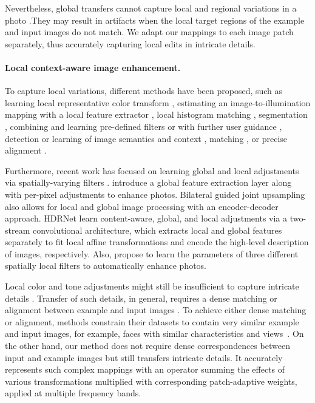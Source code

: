 Nevertheless, global transfers cannot capture local and regional variations in a photo \cite{CohenOr06Color}.They may result in artifacts when the local target regions of the example and input images do not match. We adapt our mappings to each image patch separately, thus accurately capturing local edits in intricate details.

\paragraph{Local context-aware image enhancement.} 
 To capture local variations, different methods have been proposed, such as learning local representative color transform \cite{kim2021representative}, estimating an image-to-illumination mapping with a local feature extractor \cite{wang2019underexposed}, local histogram matching \cite{Shapira13Image}, segmentation \cite{Laffont14Transient,Tai07Soft}, combining and learning pre-defined filters \cite{Berthouzoz11AFramework,Chen18Deep,Huang14Parametric,Omiya18Learning,Saeedi18Multimodal} or with further user guidance \cite{An10User,Pouli11Progressive,Tai05Local}, detection or learning of image semantics and context \cite{Gharbi17Deep,Hwang12Context,Kaufman12Content,Nam17Deep,Yan14Automatic,Zhu18Automatic}, matching \cite{HaCohen11Nonrigid}, or precise alignment \cite{Kagarlitsky09Piecewise, Shih13Data}. 
 
 Furthermore, recent work has focused on learning global and local adjustments via spatially-varying filters \cite{moran2020deeplpf, Gharbi17Deep, chen2018deep, shaham2021spatially, li2020lapar}. \citeauthor{chen2018deep} \cite{chen2018deep} introduce a global feature extraction layer along with per-pixel adjustments to enhance photos. Bilateral guided joint upsampling \cite{chen2016bilateral} also allows for local and global image processing with an encoder-decoder approach. HDRNet \cite{Gharbi17Deep} learn content-aware, global, and local adjustments via a two-stream convolutional architecture, which extracts local and global features separately to fit local affine transformations and encode the high-level description of images, respectively. Also, \citeauthor{moran2020deeplpf} \cite{moran2020deeplpf} propose to learn the parameters of three different spatially local filters to automatically enhance photos. 

Local color and tone adjustments might still be insufficient to capture intricate details \cite{Bae06Two}. Transfer of such details, in general, requires a dense matching \cite{HaCohen11Nonrigid} or alignment between example and input images \cite{Shih14Style}. To achieve either dense matching or alignment, methods constrain their datasets to contain very similar example and input images, for example, faces with similar characteristics and views~\cite{Shih14Style}. On the other hand, our method does not require dense correspondences between input and example images but still transfers intricate details. It accurately represents such complex mappings with an operator summing the effects of various transformations multiplied with corresponding patch-adaptive weights, applied at multiple frequency bands.

